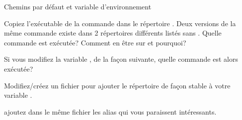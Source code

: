 \begin{exercice}
  \begin{exercicelet}{Chemins par défaut et variable d'environnement}
    \begin{questions}
    \item Copiez l'exécutable de la commande  dans le répertoire
      . Deux versions de la même commande existe dans 2
      répertoires différents listés sans . Quelle commande est
      exécutée? Comment en être sur et pourquoi?
    \item Si vous modifiez la variable , de la façon suivante,
      quelle commande est alors exécutée?
      \begin{center}
        \small{  }
      \end{center}
    \item Modifiez/créez un fichier  pour ajouter le
      répertoire  de façon stable à votre variable .
    \item ajoutez dans le même fichier les alias qui vous paraissent
      intéressants.
    \end{questions}
  \end{exercicelet}    
\end{exercice}

